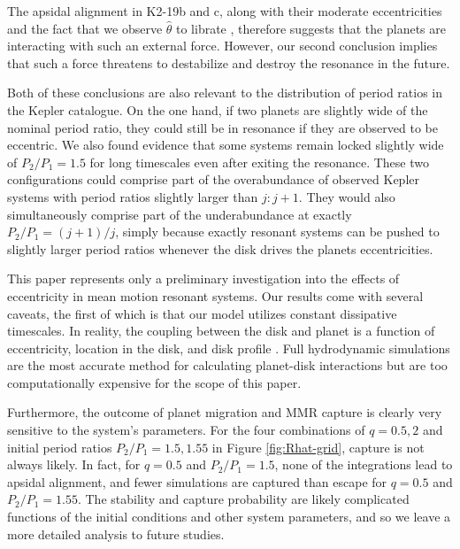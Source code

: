 \documentclass[usenatbib,twocolumn]{mnras}
\begin{document}
\noindent The apsidal alignment in K2-19b and c, along with
their moderate eccentricities and the fact that we observe
\(\hat\theta\) to librate \citep{petit_resonance_2020}, therefore
suggests that the planets are interacting with such an external force.
However, our second conclusion implies that such a force threatens to
destabilize and destroy the resonance in the future.

Both of these conclusions are also relevant to the distribution of
period ratios in the Kepler catalogue.  On the one hand, if two
planets are slightly wide of the nominal period ratio, they could
still be in resonance if they are observed to be eccentric.  We also
found evidence that some systems remain locked slightly wide of
\(P_2/P_1=1.5\) for long timescales even after exiting the resonance.
These two configurations could comprise part of the overabundance of
observed Kepler systems with period ratios slightly larger than
\(j:j+1\). They would also simultaneously comprise part of the
underabundance at exactly \(P_2/P_1 = (j+1)/j\), simply because exactly
resonant systems can be pushed to slightly larger period ratios
whenever the disk drives the planets eccentricities.

This paper represents only a preliminary investigation into the
effects of eccentricity in mean motion resonant systems. Our results
come with several caveats, the first of which is that our model
utilizes constant dissipative timescales. In reality, the coupling
between the disk and planet is a function of eccentricity, location in
the disk, and disk profile
\citep{cresswell_evolution_2006,cresswell_three-dimensional_2008}.  Full
hydrodynamic simulations are the most accurate method for calculating
planet-disk interactions but are too computationally expensive for the
scope of this paper.

Furthermore, the outcome of planet migration and MMR capture is
clearly very sensitive to the system's parameters.  For the four
combinations of \(q=0.5,2\) and initial period ratios \(P_2/P_1=1.5,1.55\)
in Figure \ref{fig:Rhat-grid}, capture is not always likely. In fact,
for \(q=0.5\) and \(P_2/P_1=1.5\), none of the integrations lead to
apsidal alignment, and fewer simulations are captured than escape for
\(q=0.5\) and \(P_2/P_1=1.55\).  The stability and capture probability are
likely complicated functions of the initial conditions and other
system parameters, and so we leave a more detailed analysis to future
studies.


\clearpage
\onecolumn
\appendix
\end{document}
